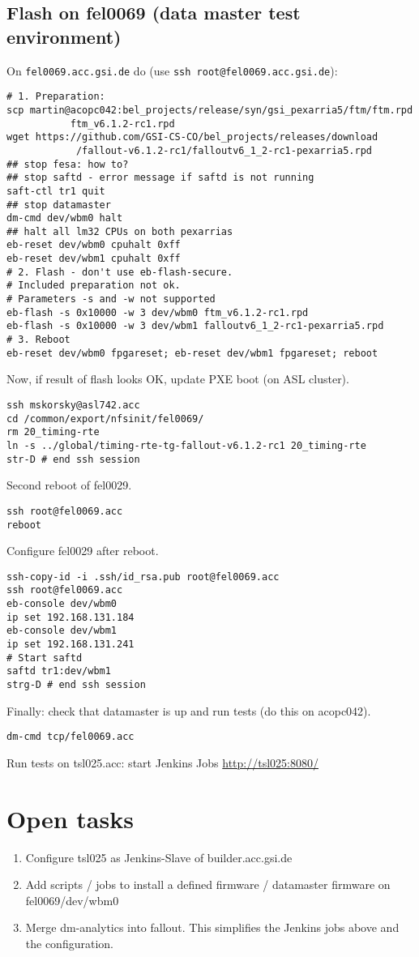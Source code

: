 \documentclass[12pt,a4paper]{report}
\begin{document}
\subsection{Flash on fel0069 (data master test environment)}
On \texttt{fel0069.acc.gsi.de} do (use \texttt{ssh root@fel0069.acc.gsi.de}):
\begin{verbatim}
# 1. Preparation:
scp martin@acopc042:bel_projects/release/syn/gsi_pexarria5/ftm/ftm.rpd
           ftm_v6.1.2-rc1.rpd
wget https://github.com/GSI-CS-CO/bel_projects/releases/download
            /fallout-v6.1.2-rc1/falloutv6_1_2-rc1-pexarria5.rpd
## stop fesa: how to?
## stop saftd - error message if saftd is not running
saft-ctl tr1 quit
## stop datamaster
dm-cmd dev/wbm0 halt
## halt all lm32 CPUs on both pexarrias
eb-reset dev/wbm0 cpuhalt 0xff
eb-reset dev/wbm1 cpuhalt 0xff
# 2. Flash - don't use eb-flash-secure.
# Included preparation not ok.
# Parameters -s and -w not supported
eb-flash -s 0x10000 -w 3 dev/wbm0 ftm_v6.1.2-rc1.rpd
eb-flash -s 0x10000 -w 3 dev/wbm1 falloutv6_1_2-rc1-pexarria5.rpd
# 3. Reboot
eb-reset dev/wbm0 fpgareset; eb-reset dev/wbm1 fpgareset; reboot
\end{verbatim}
Now, if result of flash looks OK, update PXE boot (on ASL cluster).
\begin{verbatim}
ssh mskorsky@asl742.acc
cd /common/export/nfsinit/fel0069/
rm 20_timing-rte
ln -s ../global/timing-rte-tg-fallout-v6.1.2-rc1 20_timing-rte
str-D # end ssh session
\end{verbatim}
Second reboot of fel0029.
\begin{verbatim}
ssh root@fel0069.acc
reboot
\end{verbatim}
Configure fel0029 after reboot.
\begin{verbatim}
ssh-copy-id -i .ssh/id_rsa.pub root@fel0069.acc
ssh root@fel0069.acc
eb-console dev/wbm0
ip set 192.168.131.184
eb-console dev/wbm1
ip set 192.168.131.241
# Start saftd
saftd tr1:dev/wbm1
strg-D # end ssh session
\end{verbatim}
Finally: check that datamaster is up and run tests (do this on acopc042).
\begin{verbatim}
dm-cmd tcp/fel0069.acc
\end{verbatim}
Run tests on tsl025.acc: start Jenkins Jobs \url{http://tsl025:8080/}

\section{Open tasks}
\begin{enumerate}
\item Configure tsl025 as Jenkins-Slave of builder.acc.gsi.de
\item Add scripts / jobs to install a defined firmware / datamaster firmware on fel0069/dev/wbm0
\item Merge dm-analytics into fallout. This simplifies the Jenkins jobs above and the configuration.
\end{enumerate}
\end{document}
